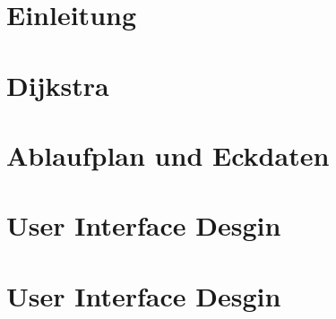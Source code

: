 







%

\newpage

\hypersetup{linkcolor=black}

\setcounter{secnumdepth}{5} 
\setcounter{tocdepth}{5} 
\tableofcontents
\restoregeometry
\newpage

\chapter{Einleitung}

\chapter{Dijkstra}

\chapter{Ablaufplan und Eckdaten}

\chapter{User Interface Desgin}

\chapter{User Interface Desgin}




%
%

%

\newpage
\listoffigures
\newpage

%
%
